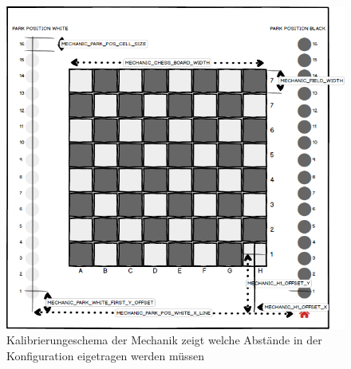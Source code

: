 \begin{figure}
\centering
\includegraphics{images/ATC_Calibration_Guide.png}
\caption{Kalibrierungeschema der Mechanik zeigt welche Abstände in der
Konfiguration eigetragen werden müssen}
\end{figure}
